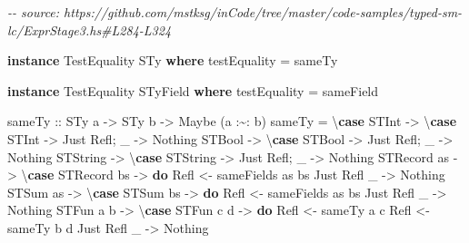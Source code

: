 \documentclass[]{article}
\newenvironment{Shaded}{}{}
\newcommand{\CommentTok}[1]{\textcolor[rgb]{0.38,0.63,0.69}{\textit{#1}}}
\newcommand{\DataTypeTok}[1]{\textcolor[rgb]{0.56,0.13,0.00}{#1}}
\newcommand{\KeywordTok}[1]{\textcolor[rgb]{0.00,0.44,0.13}{\textbf{#1}}}
\newcommand{\NormalTok}[1]{#1}
\newcommand{\OperatorTok}[1]{\textcolor[rgb]{0.40,0.40,0.40}{#1}}
\newcommand{\OtherTok}[1]{\textcolor[rgb]{0.00,0.44,0.13}{#1}}
\begin{document}
\begin{Shaded}
\begin{Highlighting}[]
\CommentTok{{-}{-} source: https://github.com/mstksg/inCode/tree/master/code{-}samples/typed{-}sm{-}lc/ExprStage3.hs\#L284{-}L324}

\KeywordTok{instance} \DataTypeTok{TestEquality} \DataTypeTok{STy} \KeywordTok{where}
\NormalTok{    testEquality }\OtherTok{=}\NormalTok{ sameTy}

\KeywordTok{instance} \DataTypeTok{TestEquality} \DataTypeTok{STyField} \KeywordTok{where}
\NormalTok{    testEquality }\OtherTok{=}\NormalTok{ sameField}

\OtherTok{sameTy ::} \DataTypeTok{STy}\NormalTok{ a }\OtherTok{{-}\textgreater{}} \DataTypeTok{STy}\NormalTok{ b }\OtherTok{{-}\textgreater{}} \DataTypeTok{Maybe}\NormalTok{ (a }\OperatorTok{:\textasciitilde{}:}\NormalTok{ b)}
\NormalTok{sameTy }\OtherTok{=}\NormalTok{ \textbackslash{}}\KeywordTok{case}
  \DataTypeTok{STInt} \OtherTok{{-}\textgreater{}}\NormalTok{ \textbackslash{}}\KeywordTok{case} \DataTypeTok{STInt} \OtherTok{{-}\textgreater{}} \DataTypeTok{Just} \DataTypeTok{Refl}\NormalTok{; \_ }\OtherTok{{-}\textgreater{}} \DataTypeTok{Nothing}
  \DataTypeTok{STBool} \OtherTok{{-}\textgreater{}}\NormalTok{ \textbackslash{}}\KeywordTok{case} \DataTypeTok{STBool} \OtherTok{{-}\textgreater{}} \DataTypeTok{Just} \DataTypeTok{Refl}\NormalTok{; \_ }\OtherTok{{-}\textgreater{}} \DataTypeTok{Nothing}
  \DataTypeTok{STString} \OtherTok{{-}\textgreater{}}\NormalTok{ \textbackslash{}}\KeywordTok{case} \DataTypeTok{STString} \OtherTok{{-}\textgreater{}} \DataTypeTok{Just} \DataTypeTok{Refl}\NormalTok{; \_ }\OtherTok{{-}\textgreater{}} \DataTypeTok{Nothing}
  \DataTypeTok{STRecord}\NormalTok{ as }\OtherTok{{-}\textgreater{}}\NormalTok{ \textbackslash{}}\KeywordTok{case}
    \DataTypeTok{STRecord}\NormalTok{ bs }\OtherTok{{-}\textgreater{}} \KeywordTok{do}
      \DataTypeTok{Refl} \OtherTok{\textless{}{-}}\NormalTok{ sameFields as bs}
      \DataTypeTok{Just} \DataTypeTok{Refl}
\NormalTok{    \_ }\OtherTok{{-}\textgreater{}} \DataTypeTok{Nothing}
  \DataTypeTok{STSum}\NormalTok{ as }\OtherTok{{-}\textgreater{}}\NormalTok{ \textbackslash{}}\KeywordTok{case}
    \DataTypeTok{STSum}\NormalTok{ bs }\OtherTok{{-}\textgreater{}} \KeywordTok{do}
      \DataTypeTok{Refl} \OtherTok{\textless{}{-}}\NormalTok{ sameFields as bs}
      \DataTypeTok{Just} \DataTypeTok{Refl}
\NormalTok{    \_ }\OtherTok{{-}\textgreater{}} \DataTypeTok{Nothing}
  \DataTypeTok{STFun}\NormalTok{ a b }\OtherTok{{-}\textgreater{}}\NormalTok{ \textbackslash{}}\KeywordTok{case}
    \DataTypeTok{STFun}\NormalTok{ c d }\OtherTok{{-}\textgreater{}} \KeywordTok{do}
      \DataTypeTok{Refl} \OtherTok{\textless{}{-}}\NormalTok{ sameTy a c}
      \DataTypeTok{Refl} \OtherTok{\textless{}{-}}\NormalTok{ sameTy b d}
      \DataTypeTok{Just} \DataTypeTok{Refl}
\NormalTok{    \_ }\OtherTok{{-}\textgreater{}} \DataTypeTok{Nothing}


\end{Highlighting}
\end{Shaded}
\end{document}
